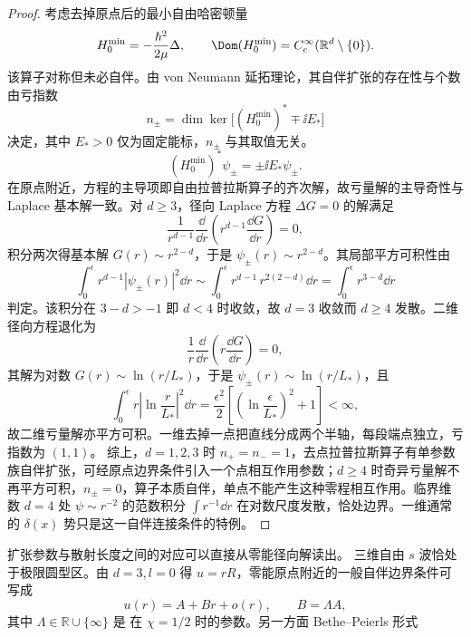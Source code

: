 \begin{proof}
考虑去掉原点后的最小自由哈密顿量
\[
 H_0^{\min}=-\frac{\hbar^2}{2\mu}\Delta,
 \qquad
 \Dom(H_0^{\min})=C_c^\infty(\mathbb R^d\setminus\{0\}).
\]
该算子对称但未必自伴。由 von Neumann 延拓理论，其自伴扩张的存在性与个数由亏指数
\begin{equation*}
 n_\pm=\dim\ker\bigl[(H_0^{\min})^*\mp \ii E_*\bigr]
\end{equation*}
决定，其中 $E_*>0$ 仅为固定能标，$n_\pm$ 与其取值无关。
\begin{equation*}
 (H_0^{\min})^*\psi_\pm=\pm \ii E_*\psi_\pm.
\end{equation*}
在原点附近，方程的主导项即自由拉普拉斯算子的齐次解，故亏量解的主导奇性与 Laplace 基本解一致。对 $d\ge3$，径向 Laplace 方程 $\Delta G=0$ 的解满足
\begin{equation*}
 \frac{1}{r^{d-1}}\frac{\dd}{\dd r}\left(r^{d-1}\frac{\dd G}{\dd r}\right)=0,
\end{equation*}
积分两次得基本解 $G(r)\sim r^{2-d}$，于是 $\psi_\pm(r)\sim r^{2-d}$。其局部平方可积性由
\begin{equation*}
 \int_0^\epsilon r^{d-1}|\psi_\pm(r)|^2\dd r
 \sim
 \int_0^\epsilon r^{d-1}\,r^{2(2-d)}\dd r
 =
 \int_0^\epsilon r^{3-d}\dd r
\end{equation*}
判定。该积分在 $3-d>-1$ 即 $d<4$ 时收敛，故 $d=3$ 收敛而 $d\ge4$ 发散。二维径向方程退化为
\begin{equation*}
 \frac{1}{r}\frac{\dd}{\dd r}\left(r\frac{\dd G}{\dd r}\right)=0,
\end{equation*}
其解为对数 $G(r)\sim\ln(r/L_*)$，于是 $\psi_\pm(r)\sim\ln(r/L_*)$，且
\begin{equation*}
 \int_0^\epsilon r\left|\ln\frac r{L_*}\right|^2\dd r
 =\frac{\epsilon^2}{2}\left[\left(\ln\frac\epsilon{L_*}\right)^2+1\right]<\infty,
\end{equation*}
故二维亏量解亦平方可积。一维去掉一点把直线分成两个半轴，每段端点独立，亏指数为 $(1,1)$。
综上，$d=1,2,3$ 时 $n_+=n_-=1$，去点拉普拉斯算子有单参数族自伴扩张，可经原点边界条件引入一个点相互作用参数；$d\ge4$ 时奇异亏量解不再平方可积，$n_\pm=0$，算子本质自伴，单点不能产生这种零程相互作用。临界维数 $d=4$ 处 $\psi\sim r^{-2}$ 的范数积分 $\int r^{-1}\dd r$ 在对数尺度发散，恰处边界。一维通常的 $\delta(x)$ 势只是这一自伴连接条件的特例。
\end{proof}
扩张参数与散射长度之间的对应可以直接从零能径向解读出。
三维自由 $s$ 波恰处于极限圆型区。由 $d=3,l=0$ 得 $u=rR$，零能原点附近的一般自伴边界条件可写成
\[
u(r)=A+Br+o(r),\qquad B=\Lambda A,
\]
其中 $\Lambda\in\mathbb R\cup\{\infty\}$ 是 在 $\chi=1/2$ 时的参数。另一方面 Bethe--Peierls 形式
